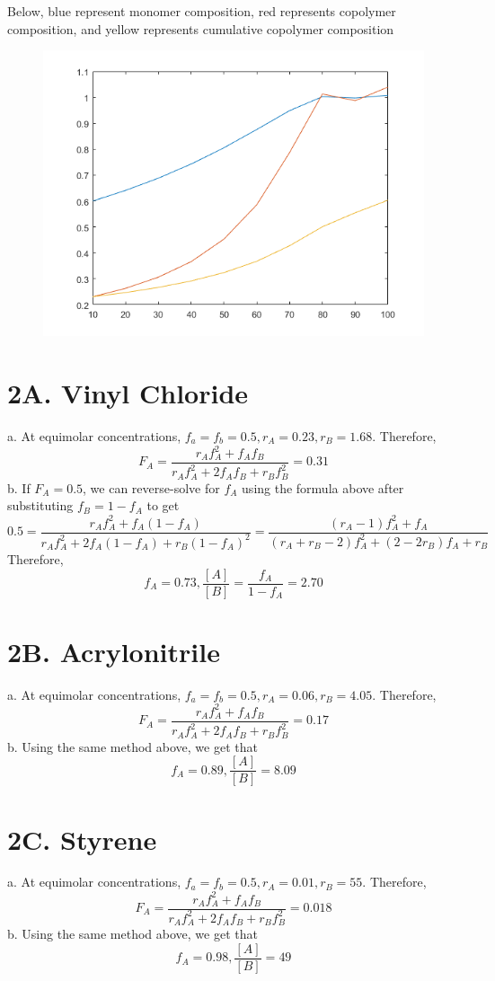 \documentclass{article}
\begin{document}
Below, blue represent monomer composition, red represents copolymer composition, and yellow represents cumulative copolymer composition
\begin{figure}[h]
\centering
\includegraphics[scale=0.6]{P1.png}
\end{figure}
\vspace{1in}

\section*{2A. Vinyl Chloride}
a. At equimolar concentrations, $f_a=f_b=0.5, r_A=0.23, r_B=1.68$. Therefore,
$$F_A=\frac{r_Af_A^2+f_Af_B}{r_Af_A^2+2f_Af_B+r_Bf_B^2}=0.31$$
b. If $F_A=0.5$, we can reverse-solve for $f_A$ using the formula above after substituting $f_B=1-f_A$ to get $$0.5=\frac{r_Af_A^2+f_A(1-f_A)}{r_Af_A^2+2f_A(1-f_A)+r_B(1-f_A)^2}=\frac{(r_A-1)f_A^2+f_A}{(r_A+r_B-2)f_A^2+(2-2r_B)f_A+r_B}$$
Therefore, 
$$ f_A=0.73, \frac{[A]}{[B]}=\frac{f_A}{1-f_A}=2.70$$

\section*{2B. Acrylonitrile}
a. At equimolar concentrations, $f_a=f_b=0.5, r_A=0.06, r_B=4.05$. Therefore,
$$F_A=\frac{r_Af_A^2+f_Af_B}{r_Af_A^2+2f_Af_B+r_Bf_B^2}=0.17$$
b. Using the same method above, we get that $$f_A=0.89, \frac{[A]}{[B]}=8.09$$

\section*{2C. Styrene}
a. At equimolar concentrations, $f_a=f_b=0.5, r_A=0.01, r_B=55$. Therefore,
$$F_A=\frac{r_Af_A^2+f_Af_B}{r_Af_A^2+2f_Af_B+r_Bf_B^2}=0.018$$
b. Using the same method above, we get that $$f_A=0.98, \frac{[A]}{[B]}=49$$
\end{document}
